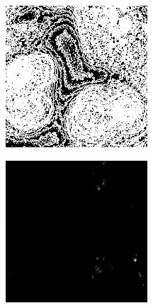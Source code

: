 \begin{figure}[htb]
\begin{subfigure}[b]{0.22\textwidth}
		\includegraphics[width=\textwidth]{bilder/preprocessing/crop_golgi_not_full_processed_mask.png}
		\caption{}
		\label{subfig:vanilla-mask}
	\end{subfigure}
	\hfill
	\begin{subfigure}[b]{0.22\textwidth}
		\centering
		\includegraphics[width=\textwidth]{bilder/preprocessing/crop_golgi_full_processed.png}

\end{subfigure}
\end{figure}
